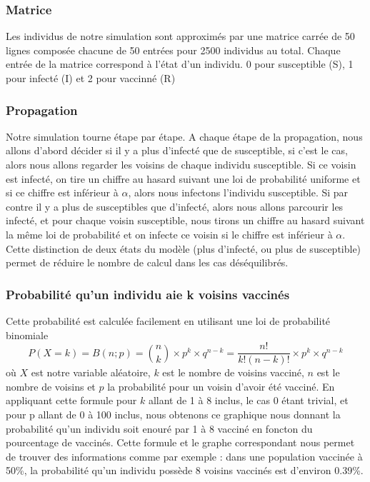 \documentclass[10pt]{article}
\begin{document}
\subsubsection{Matrice}
Les individus de notre simulation sont approximés par une matrice carrée de 50 lignes composée chacune de 50 entrées pour 2500 individus au total. Chaque entrée de la matrice correspond à l'état d'un individu. 0 pour susceptible (S), 1 pour infecté (I) et 2 pour vaccinné (R)
\subsubsection{Propagation}
Notre simulation tourne étape par étape. A chaque étape de la propagation, nous allons d'abord décider si il y a plus d'infecté que de susceptible, si c'est le cas, alors nous allons regarder les voisins de chaque individu susceptible. Si ce voisin est infecté, on tire un chiffre au hasard suivant une loi de probabilité uniforme et si ce chiffre est inférieur à $\alpha$, alors nous infectons l'individu susceptible. Si par contre il y a plus de susceptibles que d'infecté, alors nous allons parcourir les infecté, et pour chaque voisin susceptible, nous tirons un chiffre au hasard suivant la même loi de probabilité et on infecte ce voisin si le chiffre est inférieur à $\alpha$. Cette distinction de deux états du modèle (plus d'infecté, ou plus de susceptible) permet de réduire le nombre de calcul dans les cas déséquilibrés.


\subsubsection{Probabilité qu'un individu aie k voisins vaccinés}
Cette probabilité est calculée facilement en utilisant une loi de probabilité binomiale $$P(X = k) = B(n;p) = {n \choose k}\times p^k \times q^{n-k} = \frac{n!}{k!(n-k)!}\times p^k \times q^{n-k}$$ où $X$ est notre variable aléatoire, $k$ est le nombre de voisins vacciné, $n$ est le nombre de voisins et $p$ la probabilité pour un voisin d'avoir été vacciné. En appliquant cette formule pour $k$ allant de 1 à 8 inclus, le cas 0 étant trivial, et pour p allant de 0 à 100 inclus, nous obtenons ce graphique nous donnant la probabilité qu'un individu soit enouré par 1 à 8 vacciné en foncton du pourcentage de vaccinés. Cette formule et le graphe correspondant nous permet de trouver des informations comme par exemple : dans une population vaccinée à 50\%, la probabilité qu'un individu possède 8 voisins vaccinés est d'environ 0.39\%.
\end{document}
